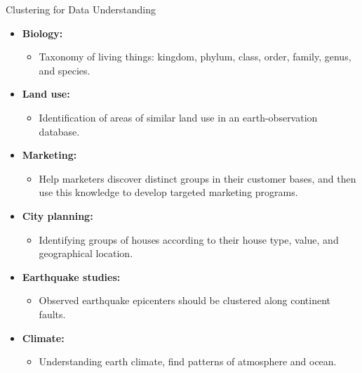 \begin{frame}{Clustering for Data Understanding}
	\begin{itemize}
		\item \textbf{Biology:}
		      \begin{itemize}
			      \item Taxonomy of living things: kingdom, phylum, class, order,
			            family, genus, and species.
		      \end{itemize}
		\item \textbf{Land use:}
		      \begin{itemize}
			      \item Identification of areas of similar land use in an
			            earth-observation database.
		      \end{itemize}
		\item \textbf{Marketing:}
		      \begin{itemize}
			      \item Help marketers discover distinct groups in their customer
			            bases, and then use this knowledge to develop targeted marketing
			            programs.
		      \end{itemize}
		\item \textbf{City planning:}
		      \begin{itemize}
			      \item Identifying groups of houses according to their house type,
			            value, and geographical location.
		      \end{itemize}
		\item \textbf{Earthquake studies:}
		      \begin{itemize}
			      \item Observed earthquake epicenters should be clustered along
			            continent faults.
		      \end{itemize}
		\item \textbf{Climate:}
		      \begin{itemize}
			      \item Understanding earth climate, find patterns of atmosphere and
			            ocean.
		      \end{itemize}
	\end{itemize}
\end{frame}

